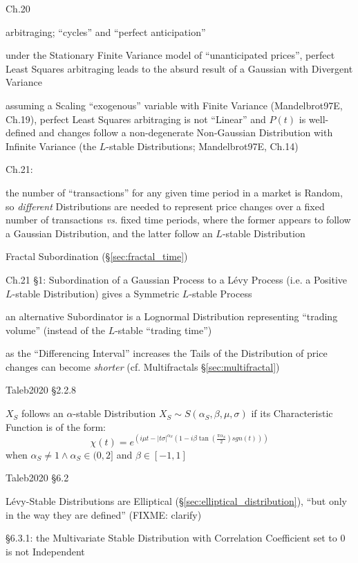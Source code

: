Ch.20

arbitraging; ``cycles'' and ``perfect anticipation''

under the Stationary Finite Variance model of ``unanticipated prices'', perfect
Least Squares arbitraging leads to the absurd result of a Gaussian with
Divergent Variance

assuming a Scaling ``exogenous'' variable with Finite Variance (Mandelbrot97E,
Ch.19), perfect Least Squares arbitraging is not ``Linear'' and $P(t)$ is
well-defined and changes follow a non-degenerate Non-Gaussian Distribution with
Infinite Variance (the $L$-stable Distributions; Mandelbrot97E, Ch.14)

Ch.21:

the number of ``transactions'' for any given time period in a market is Random,
so \emph{different} Distributions are needed to represent price changes over a
fixed number of transactions \emph{vs.} fixed time periods, where the former
appears to follow a Gaussian Distribution, and the latter follow an $L$-stable
Distribution

Fractal Subordination (\S\ref{sec:fractal_time})

Ch.21 \S 1: Subordination of a Gaussian Process to a L\'evy Process (i.e. a
Positive $L$-stable Distribution) gives a Symmetric $L$-stable Process

an alternative Subordinator is a Lognormal Distribution representing ``trading
volume'' (instead of the $L$-stable ``trading time'')

as the ``Differencing Interval'' increases the Tails of the Distribution of
price changes can become \emph{shorter} (cf. Multifractals
\S\ref{sec:multifractal})

\asterism

Taleb2020 \S 2.2.8

$X_S$ follows an $\alpha$-stable Distribution
$X_S \sim S(\alpha_S, \beta, \mu, \sigma)$ if its Characteristic Function is of
the form:
\[
  \chi(t) =
    e^{(i\mu t
      - |t\sigma|^{\alpha_S} (1 - i\beta \tan(\frac{\pi\alpha_S}{2}) sgn(t))
    )}
\]
when $\alpha_S \neq 1 \wedge \alpha_S \in (0, 2]$ and $\beta \in [-1, 1]$

Taleb2020 \S 6.2

L\'evy-Stable Distributions are Elliptical
(\S\ref{sec:elliptical_distribution}), ``but only in the way they are defined''
(FIXME: clarify)

\S 6.3.1: the Multivariate Stable Distribution with Correlation Coefficient set
to $0$ is not Independent

